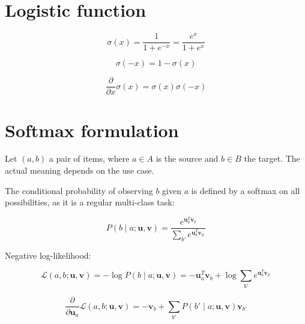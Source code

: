 \documentclass[a4paper,oneside,12pt]{article}
\begin{document}


\section{Logistic function}

\begin{equation}
\sigma (x) = \frac{1}{1 + e^{-x}} = \frac{e^x}{1 + e^x}
\end{equation}

\begin{equation}
\sigma (-x) = 1 - \sigma (x)
\end{equation}

\begin{equation}
\frac{\partial}{\partial x} \sigma (x) = \sigma (x) \sigma (-x)
\end{equation}


\section{Softmax formulation}

Let $(a, b)$ a pair of items, where $a \in A$ is the source and $b \in B$ the target. The actual meaning depends on the use case.


The conditional probability of observing $b$ given $a$ is defined by a softmax on all possibilities, as it is a regular multi-class task:

\begin{equation}
P(b \mid a ; \mathbf{u}, \mathbf{v}) = \frac{e^{\mathbf{u}_a^T \mathbf{v}_b}}{\sum_{b'} e^{\mathbf{u}_a^T \mathbf{v}_{b'}}}
\end{equation}

Negative log-likelihood:

\begin{equation}
\mathcal{L} (a, b ; \mathbf{u}, \mathbf{v}) = -\log P(b \mid a ; \mathbf{u}, \mathbf{v}) = -\mathbf{u}_a^T \mathbf{v}_b + \log \sum_{b'} e^{\mathbf{u}_a^T \mathbf{v}_{b'}}
\end{equation}

\begin{equation}
\frac{\partial}{\partial \mathbf{u}_a} \mathcal{L} (a, b ; \mathbf{u}, \mathbf{v}) = -\mathbf{v}_b + \sum_{b'} P(b' \mid a ; \mathbf{u}, \mathbf{v}) \mathbf{v}_{b'}
\end{equation}
\end{document}
